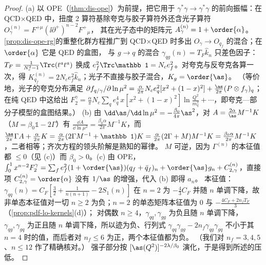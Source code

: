 \begin{proof}
(a) 以 OPE（\cref{thm:dis-ope}）为前提，把它用于 $\gamma^*\gamma\to\gamma^*\gamma$ 的前向振幅：在 QCD$\times$QED 中，扭度 2 算符基除夸克与胶子算符外还含光子算符 $O_\gamma^{(n)}=F^{+\mu}(\ii\partial^+)^{n-2}F^{+}{}_\mu$，
其在光子态中的矩阵元 $A_\gamma^{(n)}=1+\order{\alpha}$。\cref{prop:dis-ope-rg}的重整化群方程推广到 QCD$\times$QED 时多出 $O_\gamma\to O_{q_f}$ 的混合；在 $\order{\alpha}$ 它是 QED 的盒图，
与 $g\to q$ 的混合 $\gamma_{qg}(n)=T_F\hat k_n$ 只差色因子：$T_F=\frac{1}{N_c^2-1}\Trc(t^at^a)$ 换成 $e_f^2\Trc\mathbb 1=N_ce_f^2$。对夸克与反夸克各算一次，得 $K^{(n)}_{q_f}=2N_ce_f^2\hat k_n$；光子不直接与胶子混合，$K_g=\order{\as}$。
（等价地，光子的夸克分布满足 $\partial f_{q/\gamma}/\partial\ln\mu^2=\frac{\alpha}{2\pi}N_ce_q^2[x^2+(1-x)^2]+\frac{\as}{2\pi}(P\otimes f_\gamma)_q$；在纯 QED 中这给出 $F_2^\gamma=\frac{\alpha}\pi N_c\sum_qe_q^4\,x[x^2+(1-x)^2]\ln\frac{Q^2}{m_q^2}+\cdots$，即夸克—部分子模型的盒图结果。）%
(b) 由 $\dd\as/\dd\ln\mu^2=-\frac{\beta_0}{4\pi}\as^2$，对 $A=\frac{2\alpha}{\as}M^{-1}K$（$M=\beta_0\mathbb 1-2\Gamma$）有 $\frac{\dd A}{\dd\ln\mu^2}=\frac{\beta_0\alpha}{2\pi}M^{-1}K$，而
$\frac{\as}{2\pi}\Gamma A+\frac{\alpha}{2\pi}K=\frac{\alpha}{2\pi}(2\Gamma M^{-1}+\mathbb 1)K=\frac{\alpha}{2\pi}(2\Gamma+M)M^{-1}K=\frac{\beta_0\alpha}{2\pi}M^{-1}K$，二者相等；齐次方程的领头阶解是熟知的幂律。
$M$ 可逆，因为 $\Gamma^{(n)}$ 的本征值都 $\le0$（见 (c)）而 $\beta_0>0$。(c) 由 OPE，$\int_0^1x^{n-2}F_2^\gamma=\sum_fe_f^2(1+\order{\as})(q_f+\bar q_f)_n+\order{\as}g_n+C^{(n)}_{2,\gamma}$，直接项 $C^{(n)}_{2,\gamma}=\order{\alpha}$ 没有 $1/\as$ 的增强，代入 (b) 即得 $a_n$。
本征值：$\gamma_{qq}(n)=C_F[\frac32+\frac1{n(n+1)}-2S_1(n)]$ 在 $n=2$ 为 $-\frac43C_F$ 并随 $n$ 单调下降，故非单态本征值对一切 $n\ge2$ 为负；$n=2$ 的单态矩阵本征值为 $0$ 与 $-\frac{4C_F+2n_fT_F}3$（\cref{prop:pdf-lo-kernels}(d)）；
对偶数 $n\ge4$，$\gamma_{qq},\gamma_{gg}$ 为负且随 $n$ 单调下降，$\gamma_{qg},\gamma_{gq}$ 为正且随 $n$ 单调下降，所以迹为负、行列式 $\gamma_{qq}\gamma_{gg}-2n_f\gamma_{qg}\gamma_{gq}$ 不小于其 $n=4$ 时的值，而后者对 $n_f\le6$ 为正，两个本征值都为负。
（我们对 $n_f=3,4,5$、$n\le12$ 作了精确核对。）%
强子部分按 $[\as(Q^2)]^{-2\lambda/\beta_0}$ 演化，于是得到所述的压低。
\end{proof}

